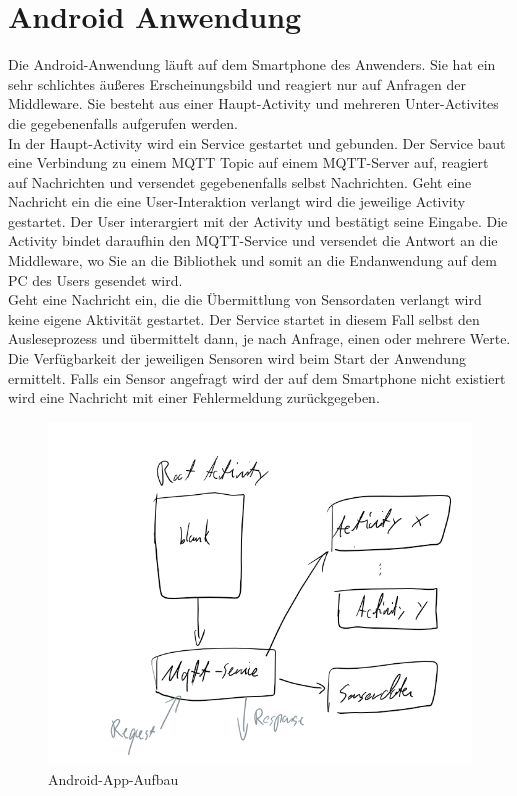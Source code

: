\documentclass[11pt,a4paper]{report}
\begin{document}
\section*{Android Anwendung}
Die Android-Anwendung läuft auf dem Smartphone des Anwenders.
Sie hat ein sehr schlichtes äußeres Erscheinungsbild und reagiert nur auf Anfragen der Middleware.
Sie besteht aus einer Haupt-Activity und mehreren Unter-Activites die gegebenenfalls aufgerufen werden.
\\
In der Haupt-Activity wird ein Service gestartet und gebunden.
Der Service baut eine Verbindung zu einem MQTT Topic auf einem MQTT-Server auf, reagiert auf Nachrichten und versendet gegebenenfalls selbst Nachrichten.
Geht eine Nachricht ein die eine User-Interaktion verlangt wird die jeweilige Activity gestartet.
Der User interargiert mit der Activity und bestätigt seine Eingabe.
Die Activity bindet daraufhin den MQTT-Service und versendet die Antwort an die Middleware, wo Sie an die Bibliothek und somit an die Endanwendung auf dem PC des Users gesendet wird.
\\
Geht eine Nachricht ein, die die Übermittlung von Sensordaten verlangt wird keine eigene Aktivität gestartet.
Der Service startet in diesem Fall selbst den Ausleseprozess und übermittelt dann, je nach Anfrage, einen oder mehrere Werte.
Die Verfügbarkeit der jeweiligen Sensoren wird beim Start der Anwendung ermittelt.
Falls ein Sensor angefragt wird der auf dem Smartphone nicht existiert wird eine Nachricht mit einer Fehlermeldung zurückgegeben.
\begin{figure}[htbp]
  \centering
  \includegraphics[width=.9\textwidth]{images/android_app.png}
  \caption{Android-App-Aufbau}
  \label{fig:android_app}
\end{figure}
\end{document}
